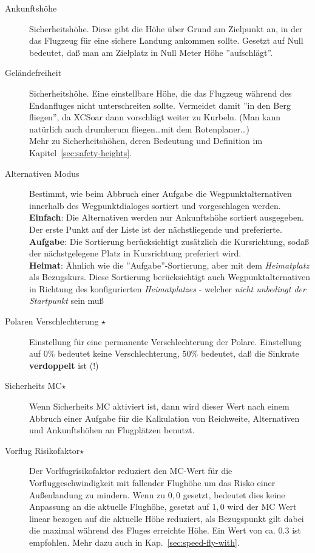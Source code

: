 \begin{description}
\item[Ankunftshöhe] Sicherheitshöhe.  Diese  gibt die Höhe über Grund am Zielpunkt an, in der das
Flugzeug für eine sichere Landung ankommen sollte. Gesetzt auf Null bedeutet, daß man am Zielplatz in Null Meter Höhe ''aufschlägt''.
\item[Geländefreiheit]  \label{conf:safetyterrain} Sicherheitshöhe. Eine einstellbare Höhe, die das Flugzeug während des Endanfluges
nicht unterschreiten sollte. Vermeidet damit ''in den Berg fliegen'', da \textsf{XCSoar} dann vorschlägt weiter zu Kurbeln. (Man kann natürlich auch
drumherum fliegen\dots mit dem Rotenplaner\dots)\\
Mehr zu Sicherheitshöhen, deren Bedeutung und Definition  im Kapitel~\ref{sec:safety-heights}.
\item[Alternativen Modus]  \label{conf:alternatesmode} Bestimmt, wie beim Abbruch einer Aufgabe die Wegpunktalternativen
innerhalb des Wegpunktdialoges sortiert und vorgeschlagen werden. \\
{\bf Einfach}: Die Alternativen werden nur Ankunftshöhe sortiert ausgegeben. Der erste Punkt auf der Liste ist der nächstliegende
und preferierte.\\
{\bf Aufgabe}: Die Sortierung berücksichtigt  zusätzlich die Kursrichtung, sodaß der nächstgelegene Platz in Kursrichtung
preferiert wird. \\
{\bf Heimat}:  Ähnlich wie die ''Aufgabe''-Sortierung, aber  mit dem \textsl{Heimatplatz} als Bezugskurs.   Diese Sortierung berücksichtigt
auch Wegpunktalternativen in Richtung des konfigurierten \textsl{Heimatplatzes}  - welcher \textsl{nicht unbedingt der Startpunkt} sein muß \achtung
\item[Polaren Verschlechterung $\star$] Einstellung für eine permanente Verschlechterung der Polare. Einstellung auf $0 \% $ bedeutet keine Verschlechterung,
$50 \% $ bedeutet, daß die Sinkrate \textbf{verdoppelt} ist (!)
\item[Sicherheits MC$\star$]  Wenn Sicherheits MC aktiviert ist, dann wird dieser Wert nach einem Abbruch einer Aufgabe
für die Kalkulation von Reichweite, Alternativen und Ankunftshöhen an Flugplätzen benutzt.
\item[Vorflug Risikofaktor$\star$]
 Der Vorlfugrisikofaktor reduziert den MC-Wert für die Vorfluggeschwindigkeit mit fallender Flughöhe um das Risko einer
 Außenlandung zu mindern. Wenn zu $0,0$ gesetzt, bedeutet dies keine Anpassung an die aktuelle Flughöhe, gesetzt auf $1,0$
wird der MC Wert linear bezogen auf die aktuelle Höhe reduziert, als Bezugspunkt gilt dabei die maximal während des
Fluges erreichte Höhe.
Ein Wert von ca. $0.3$ ist empfohlen.  Mehr dazu auch in Kap.~\ref{sec:speed-fly-with}.
\end{description}

